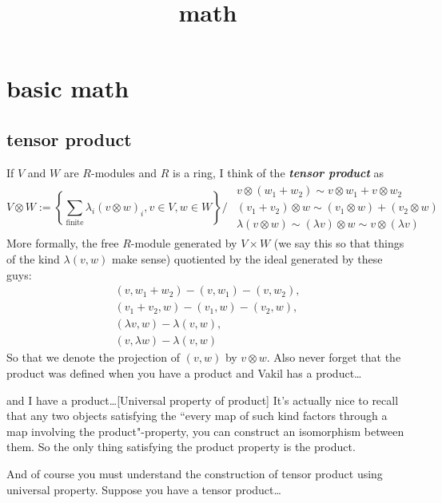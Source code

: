 
\title{math}


\maketitle
{}
\tableofcontents
\clearpage
\chapter{basic math}

\section{tensor product}

\begin{defn}\leavevmode
If \(V\) and \(W\) are \(R\)-modules and \(R\) is a ring, I think of the \textit{\textbf{tensor product}} as
\[V\otimes W:=\left\{\sum_{\text{finite} }\lambda_i (v \otimes w)_i, v \in V, w \in W \right\} \Big/ \substack{\begin{array}{c}v \otimes (w_1+w_2)\sim v\otimes w_1+ v\otimes w_2\\ (v_1+v_2) \otimes w \sim(v_1 \otimes w)+(v_2 \otimes w)\\ \lambda(v \otimes w)\sim(\lambda v) \otimes w \sim  v \otimes(\lambda v)\end{array}}\]
More formally, the free \(R\)-module generated by \(V \times W\) (we say this so that things of the kind \(\lambda(v,w)\) make sense) quotiented by the ideal generated by these guys:
\begin{gather*}(v,w_1+w_2)-(v,w_1)-(v,w_2),\\ (v_1+v_2,w)-(v_1,w)-(v_2,w),\\ (\lambda v,w)-\lambda(v,w),\\(v,\lambda w)-\lambda(v,w)\end{gather*}
So that we denote the projection of \((v,w)\) by \(v \otimes w\). Also never forget that the product was defined when you have a product and Vakil has a product…
\begin{thing7}{and I have a product…}[Universal property of product]\leavevmode
It's actually nice to recall that any two objects satisfying the ``every map of such kind factors through a map involving the product"-property, you can construct an isomorphism between them. So the only thing satisfying the product property is the product.
\end{thing7}
\end{defn}
And of course you must understand the construction of tensor product using universal property. Suppose you have a tensor product…

